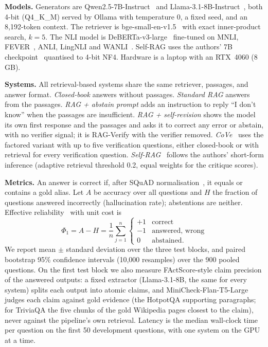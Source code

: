 \documentclass[conference]{IEEEtran}
\begin{document}
\textbf{Models.} Generators are Qwen2.5-7B-Instruct~\cite{qwen2024qwen25} and Llama-3.1-8B-Instruct~\cite{dubey2024llama3}, both 4-bit (Q4\_K\_M) served by Ollama with temperature 0, a fixed seed, and an 8{,}192-token context. The retriever is bge-small-en-v1.5~\cite{xiao2023cpack} with exact inner-product search, $k=5$. The NLI model is DeBERTa-v3-large~\cite{he2021debertav3} fine-tuned on MNLI, FEVER~\cite{thorne2018fever}, ANLI, LingNLI and WANLI~\cite{laurer2023nli}. Self-RAG uses the authors' 7B checkpoint~\cite{asai2023selfrag} quantised to 4-bit NF4. Hardware is a laptop with an RTX~4060 (8\,GB).

\textbf{Systems.} All retrieval-based systems share the same retriever, passages, and answer format. \emph{Closed-book} answers without passages. \emph{Standard RAG} answers from the passages. \emph{RAG + abstain prompt} adds an instruction to reply ``I don't know'' when the passages are insufficient. \emph{RAG + self-revision} shows the model its own first response and the passages and asks it to correct any error or abstain, with no verifier signal; it is RAG-Verify with the verifier removed. \emph{CoVe}~\cite{dhuliawala2023cove} uses the factored variant with up to five verification questions, either closed-book or with retrieval for every verification question. \emph{Self-RAG}~\cite{asai2023selfrag} follows the authors' short-form inference (adaptive retrieval threshold 0.2, equal weights for the critique scores).

\textbf{Metrics.} An answer is correct if, after SQuAD normalisation~\cite{rajpurkar2016squad}, it equals or contains a gold alias. Let $A$ be accuracy over all questions and $H$ the fraction of questions answered incorrectly (hallucination rate); abstentions are neither. Effective reliability~\cite{whitehead2022reliable} with unit cost is
\begin{equation}
\Phi_1 = A - H = \frac{1}{n}\sum_{j=1}^{n}\begin{cases}+1 & \text{correct}\\ -1 & \text{answered, wrong}\\ 0 & \text{abstained.}\end{cases}
\end{equation}
We report mean $\pm$ standard deviation over the three test blocks, and paired bootstrap 95\% confidence intervals (10{,}000 resamples) over the 900 pooled questions. On the first test block we also measure FActScore-style claim precision of the answered outputs: a fixed extractor (Llama-3.1-8B, the same for every system) splits each output into atomic claims, and MiniCheck-Flan-T5-Large~\cite{tang2024minicheck} judges each claim against gold evidence (the HotpotQA supporting paragraphs; for TriviaQA the five chunks of the gold Wikipedia pages closest to the claim), never against the pipeline's own retrieval. Latency is the median wall-clock time per question on the first 50 development questions, with one system on the GPU at a time.
\end{document}
